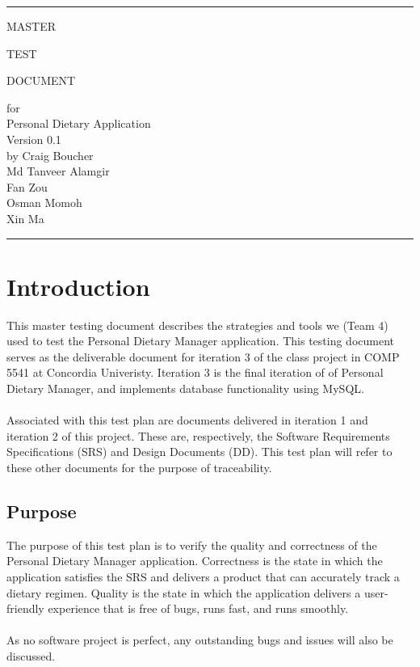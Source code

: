 \documentclass{scrreprt}
\date{}
\def\myversion{0.1}
\begin{document}
    \begin{titlepage}
        \flushright\bfseries\huge
        \rule{\linewidth}{5pt}
        \par
        \vspace{1cm}
        {\Huge MASTER \par TEST \par DOCUMENT \par}
        \vspace{2cm}
        for \\
        \vspace{2cm}
        Personal Dietary Application \\
        \vspace{2cm}
        \LARGE{Version \myversion \\}
        \vspace{2cm}
        by Craig Boucher \\
        Md Tanveer Alamgir \\
        Fan Zou\\
        Osman Momoh \\
        Xin Ma
        \vspace{2cm}
        \rule{\linewidth}{5pt}
    \end{titlepage}

    \tableofcontents

    \chapter{Introduction}
    This master testing document describes the strategies and tools we (Team 4) used to test the Personal Dietary Manager application. This testing document serves as the deliverable document for iteration 3 of the class project in COMP 5541 at Concordia Univeristy. Iteration 3 is the final iteration of of Personal Dietary Manager, and implements database functionality using MySQL. \\ \\
    Associated with this test plan are documents delivered in iteration 1 and iteration 2 of this project. These are, respectively, the Software Requirements Specifications (SRS) and Design Documents (DD). This test plan will refer to these other documents for the purpose of traceability.

    \section{Purpose}
    The purpose of this test plan is to verify the quality and correctness of the Personal Dietary Manager application. Correctness is the state in which the application satisfies the SRS and delivers a product that can accurately track a dietary regimen. Quality is the state in which the application delivers a user-friendly experience that is free of bugs, runs fast, and runs smoothly. \\\\
    As no software project is perfect, any outstanding bugs and issues will also be discussed.
\end{document}
